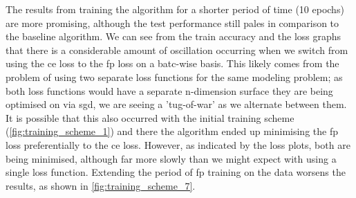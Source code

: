 The results from training the algorithm for a shorter period of time (10 epochs) are more promising, although the test performance still pales in comparison to the baseline algorithm. We can see from the train accuracy and the loss graphs that there is a considerable amount of oscillation occurring when we switch from using the \gls{ce} loss to the \gls{fp} loss on a batc-wise basis. This likely comes from the problem of using two separate loss functions for the same modeling problem; as both loss functions would have a separate n-dimension surface they are being optimised on via \gls{sgd}, we are seeing a 'tug-of-war' as we alternate between them. It is possible that this also occurred with the initial training scheme (\ref{fig:training_scheme_1}) and there the algorithm ended up minimising the \gls{fp} loss preferentially to the \gls{ce} loss. However, as indicated by the loss plots, both are being minimised, although far more slowly than we might expect with using a single loss function. Extending the period of \gls{fp} training on the data worsens the results, as shown in \ref{fig:training_scheme_7}.
\bigskip



